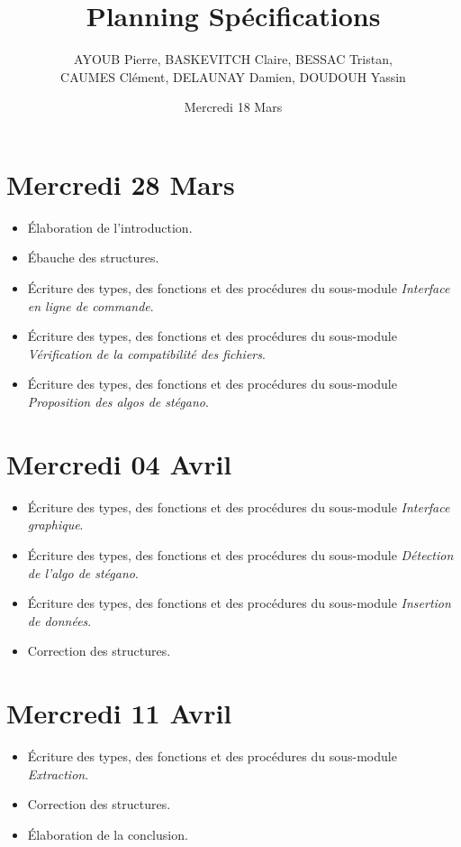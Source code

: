 \documentclass[11pt]{article}
\title{Planning Spécifications}
\author{AYOUB Pierre, BASKEVITCH Claire, BESSAC Tristan, \\
CAUMES Clément, DELAUNAY Damien, DOUDOUH Yassin}
\date{Mercredi 18 Mars}
\begin{document}
\maketitle

\section{Mercredi 28 Mars}
\begin {itemize}
\item Élaboration de l'introduction. 
\item Ébauche des structures.
\item Écriture des types, des fonctions et des procédures du sous-module 
\textit{Interface en ligne de commande}.
\item Écriture des types, des fonctions et des procédures du sous-module 
\textit{Vérification de la compatibilité des fichiers}.
\item Écriture des types, des fonctions et des procédures du sous-module 
\textit{Proposition des algos de stégano}.
\end{itemize}

\section{Mercredi 04 Avril}
\begin {itemize}
\item Écriture des types, des fonctions et des procédures du sous-module 
\textit{Interface graphique}. 
\item Écriture des types, des fonctions et des procédures du sous-module 
\textit{Détection de l'algo de stégano}. 
\item Écriture des types, des fonctions et des procédures du sous-module 
\textit{Insertion de données}.
\item Correction des structures. 
\end{itemize}

\section{Mercredi 11 Avril}
\begin {itemize}
\item Écriture des types, des fonctions et des procédures du sous-module 
\textit{Extraction}.
\item Correction des structures. 
\item Élaboration de la conclusion.
\end{itemize}
\end{document}
